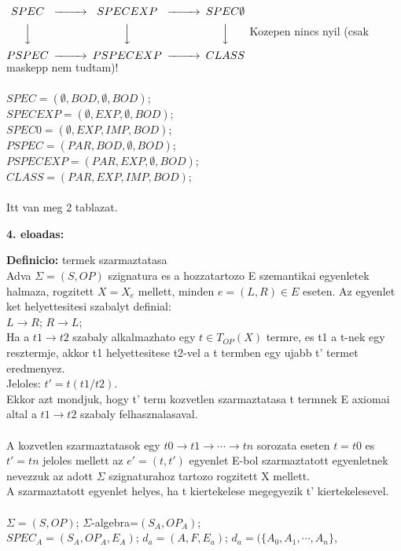 \documentclass[a4paper,10pt]{article}
\begin{document}
$
\begin{CD}
SPEC @>>> SPECEXP @>>> SPEC\emptyset\\
@VVV @VVV @VVV\\
PSPEC @>>> PSPECEXP @>>> CLASS
\end{CD}
$ Kozepen nincs nyil (csak maskepp nem tudtam)!\\ \\
$SPEC=(\emptyset, BOD, \emptyset, BOD)$;\\
$SPECEXP=(\emptyset, EXP, \emptyset, BOD)$;\\
$SPEC0=(\emptyset, EXP, IMP, BOD)$;\\
$PSPEC=(PAR, BOD, \emptyset, BOD)$;\\
$PSPECEXP=(PAR, EXP, \emptyset, BOD)$;\\
$CLASS=(PAR, EXP, IMP, BOD)$;\\ \\
Itt van meg 2 tablazat.
\newpage
%
%
\begin{flushleft}
\textbf{4. eloadas:}
\end{flushleft}
\textbf{Definicio:} termek szarmaztatasa\\
Adva $\Sigma = (S, OP)$ szignatura es a hozzatartozo E szemantikai egyenletek halmaza, rogzitett $X=X_e$ mellett, minden $e =(L,R) \in E$ eseten. Az egyenlet ket helyettesitesi szabalyt definial:\\
$L \to R$; $R \to L$;\\
Ha a $t1 \to t2$ szabaly alkalmazhato egy $t \in T_{OP}(X)$ termre, es t1 a t-nek egy resztermje, akkor t1 helyettesitese t2-vel a t termben egy ujabb t' termet eredmenyez.\\
Jeloles: $t'=t(t1/t2)$.\\
Ekkor azt mondjuk, hogy t' term kozvetlen szarmaztatasa t termnek E axiomai altal a $t1\to t2$ szabaly felhasznalasaval.\\ \\
A kozvetlen szarmaztatasok egy $t0 \to t1 \to \cdots \to tn$ sorozata eseten $t=t0$ es $t'=tn$ jeloles mellett az $e'=(t,t')$ egyenlet E-bol szarmaztatott egyenletnek nevezzuk az adott $\Sigma$ szignaturahoz tartozo rogzitett X mellett.\\
A szarmaztatott egyenlet helyes, ha t kiertekelese megegyezik t' kiertekelesevel.\\ \\
$\Sigma=(S,OP)$; $\Sigma$-algebra=$(S_A, OP_A)$;\\
$SPEC_A = (S_A, OP_A, E_A)$; $d_a=(A,F,E_a)$; $d_a=(\lbrace A_0, A_1, \cdots, A_n\rbrace$,\\
\end{document}
